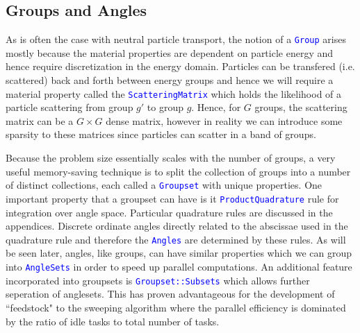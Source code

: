 \documentclass[11pt,letterpaper,titlepage]{article}
\newcommand{\xmltag}[1]{\textcolor{blue}{ \texttt{#1}} }
\newcommand{\stimes}{{\times}}
\numberwithin{equation}{section}
\begin{document}
\newpage
\subsection{Groups and Angles}
As is often the case with neutral particle transport, the notion of a \xmltag{Group} arises mostly because the material properties are dependent on particle energy and hence require discretization in the energy domain. Particles can be transfered (i.e. scattered) back and forth between energy groups and hence we will require a material property called the \xmltag{ScatteringMatrix} which holds the likelihood of a particle scattering from group $g'$ to group $g$. Hence, for $G$ groups, the scattering matrix can be a $G\stimes G$ dense matrix, however in reality we can introduce some sparsity to these matrices since particles can scatter in a band of groups.\newline 

Because the problem size essentially scales with the number of groups, a very useful memory-saving technique is to split the collection of groups into a number of distinct collections, each called a \xmltag{Groupset} with unique properties. One important property that a groupset can have is it \xmltag{ProductQuadrature} rule for integration over angle space. Particular quadrature rules are discussed in the appendices. Discrete ordinate angles directly related to the abscissae used in the quadrature rule and therefore the \xmltag{Angles} are determined by these rules. As will be seen later, angles, like groups, can have similar properties which we can group into \xmltag{AngleSets} in order to speed up parallel computations.
\newline
\newline
An additional feature incorporated into groupsets is \xmltag{Groupset::Subsets} which allows further seperation of anglesets. This has proven advantageous for the development of ``feedstock" to the sweeping algorithm where the parallel efficiency is dominated by the ratio of idle tasks to total number of tasks.


\vspace{1cm}
\end{document}
